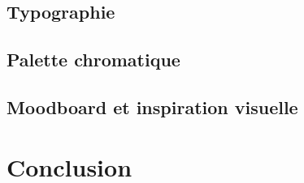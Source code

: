 \subsection{Typographie}

\subsection{Palette chromatique}

\subsection{Moodboard et inspiration visuelle}

\section*{Conclusion}
